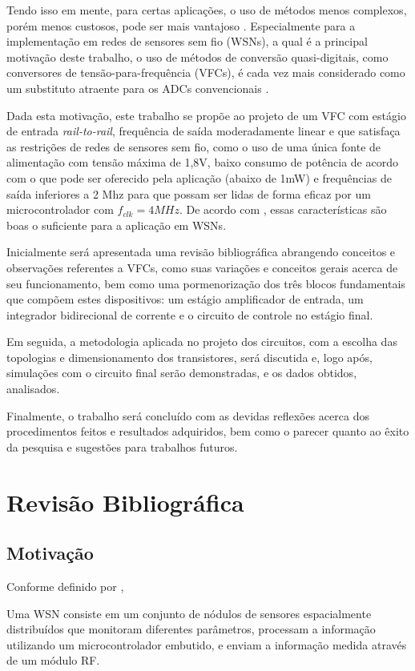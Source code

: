 \documentclass[
	12pt,				%
	oneside,			%
	a4paper,			%
	english,			%
	french,				%
	spanish,			%
	brazil				%
	]{abntex2}
\begin{document}
Tendo isso em mente, para certas aplicações, o uso de métodos menos complexos, porém menos custosos, pode ser mais vantajoso . Especialmente para a implementação em redes de sensores sem fio (WSNs), a qual é a principal motivação deste trabalho, o uso de métodos de conversão quasi-digitais, como conversores de tensão-para-frequência (VFCs), é cada vez mais considerado como um substituto atraente para os ADCs convencionais \cite{VFCbook}.

Dada esta motivação, este trabalho se propõe ao projeto de um VFC com estágio de entrada \textit{rail-to-rail}, frequência de saída moderadamente linear e que satisfaça as restrições de redes de sensores sem fio, como o uso de uma única fonte de alimentação com tensão máxima de 1,8V, baixo consumo de potência de acordo com o que pode ser oferecido pela aplicação (abaixo de 1mW) e frequências de saída inferiores a 2 Mhz para que possam ser lidas de forma eficaz por um microcontrolador com $f_{clk} = 4 MHz$. De acordo com , essas características são boas o suficiente para a aplicação em WSNs.

Inicialmente será apresentada uma revisão bibliográfica abrangendo conceitos e observações referentes a VFCs, como suas variações e conceitos gerais acerca de seu funcionamento, bem como uma pormenorização dos três blocos fundamentais que compõem estes dispositivos: um estágio amplificador de entrada, um integrador bidirecional de corrente e o circuito de controle no estágio final.

Em seguida, a metodologia aplicada no projeto dos circuitos, com a escolha das topologias e dimensionamento dos transistores, será discutida e, logo após, simulações com o circuito final serão demonstradas, e os dados obtidos, analisados.

Finalmente, o trabalho será concluído com as devidas reflexões acerca dos procedimentos feitos e resultados adquiridos, bem como o parecer quanto ao êxito da pesquisa e sugestões para trabalhos futuros.

\chapter{Revisão Bibliográfica}
\section{Motivação}
Conforme definido por , 
\begin{citacao}
Uma WSN consiste em um conjunto de nódulos de sensores espacialmente distribuídos que monitoram diferentes parâmetros, processam a informação utilizando um microcontrolador embutido, e enviam a informação medida através de um módulo RF.
\end{citacao}
\end{document}

